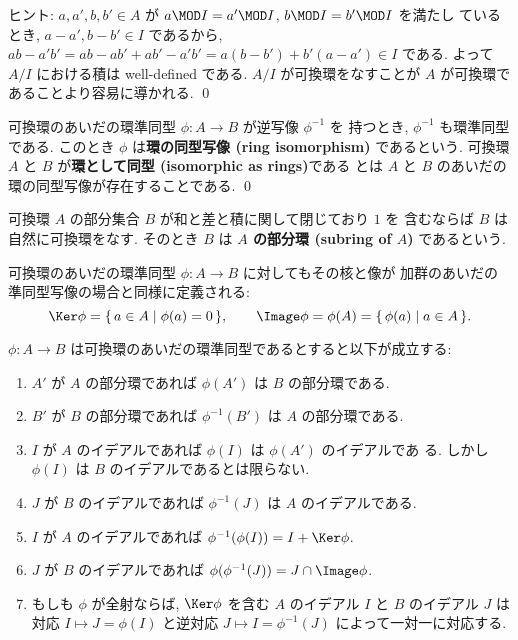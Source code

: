 \documentclass[12pt,twoside]{jarticle}
\begin{document}
\noindent
ヒント: $a,a',b,b'\in A$ が $a\MOD I=a'\MOD I$, $b\MOD I=b'\MOD I$ を満たし
ているとき, $a-a',b-b'\in I$ であるから, $
  ab - a'b' = ab - ab' + ab' - a'b' = a(b-b')+b'(a-a')\in I
$ である.  よって $A/I$ における積は well-defined である.  
$A/I$ が可換環をなすことが $A$ が可換環であることより容易に導かれる. 
\qed


\begin{question}[環の同型写像]
  可換環のあいだの環準同型 $\phi:A\to B$ が逆写像 $\phi^{-1}$ を
  持つとき, $\phi^{-1}$ も環準同型である.
  このとき $\phi$ は{\bf 環の同型写像 (ring isomorphism)} であるという.
  可換環 $A$ と $B$ が{\bf 環として同型 (isomorphic as rings)}である
  とは $A$ と $B$ のあいだの環の同型写像が存在することである. \qed
\end{question}


可換環 $A$ の部分集合 $B$ が和と差と積に関して閉じており $1$ を
含むならば $B$ は自然に可換環をなす.
そのとき $B$ は {\bf $A$ の部分環 (subring of $A$)} であるという.

可換環のあいだの環準同型 $\phi:A\to B$ に対してもその核と像が
加群のあいだの準同型写像の場合と同様に定義される:
\begin{equation*}
  \Ker\phi = \{\, a\in A \mid \phi(a) = 0 \,\},
  \qquad
  \Image\phi = \phi(A) = \{\, \phi(a) \mid a \in A \,\}.
\end{equation*}

\begin{question}
\label{q:phi:A->B}
  $\phi:A\to B$ は可換環のあいだの環準同型であるとすると以下が成立する:
  \begin{enumerate}
  \item $A'$ が $A$ の部分環であれば $\phi(A')$ は $B$ の部分環である.
  \item $B'$ が $B$ の部分環であれば $\phi^{-1}(B')$ は $A$ の部分環である.
  \item $I$ が $A$ のイデアルであれば $\phi(I)$ は $\phi(A')$ のイデアルであ
    る.  しかし $\phi(I)$ は $B$ のイデアルであるとは限らない.
  \item $J$ が $B$ のイデアルであれば $\phi^{-1}(J)$ は $A$ のイデアルである.
  \item $I$ が $A$ のイデアルであれば $\phi^{-1}(\phi(I))=I+\Ker\phi$.
  \item $J$ が $B$ のイデアルであれば $\phi(\phi^{-1}(J))=J\cap\Image\phi$.
  \item もしも $\phi$ が全射ならば, $\Ker\phi$ を含む $A$ のイデアル $I$ 
    と $B$ のイデアル $J$ は対応 $I\mapsto J=\phi(I)$ 
    と逆対応 $J\mapsto I=\phi^{-1}(J)$ によって一対一に対応する.
  \end{enumerate}
\end{question}
\end{document}
